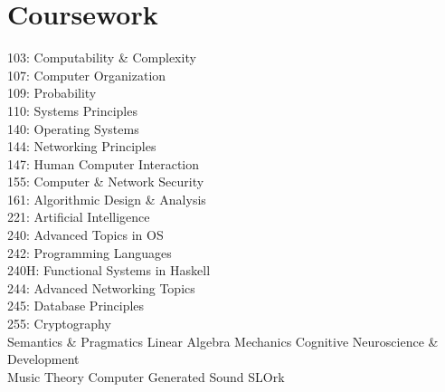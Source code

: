 \documentclass[letterpaper]{deedy-resume} %
\begin{document}
\begin{minipage}[t]{0.33\textwidth}
\sectionspace %




\section{Coursework}


103: Computability \& Complexity \\
107: Computer Organization \\
109: Probability \\
110: Systems Principles \\
140: Operating Systems \\
144: Networking Principles \\
147: Human Computer Interaction \\
155: Computer \& Network Security \\
161: Algorithmic Design \& Analysis\\
221: Artificial Intelligence \\
240: Advanced Topics in OS \\
242: Programming Languages \\
240H: Functional Systems in Haskell\\
244: Advanced Networking Topics \\
245: Database Principles \\
255: Cryptography \\
\vspace{\topsep} %
Semantics \& Pragmatics \textbullet{} Linear Algebra \textbullet{} Mechanics \textbullet{} Cognitive Neuroscience \& Development \\
Music Theory \textbullet{} Computer Generated Sound \textbullet{} SLOrk \\



\end{minipage}
\end{document}
